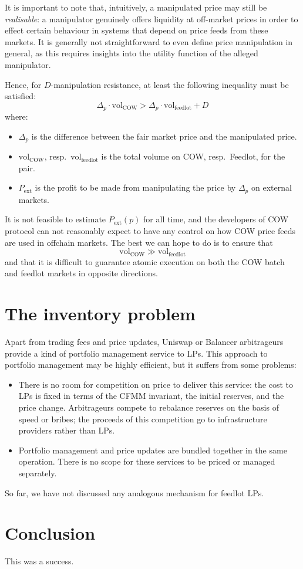 \documentclass[a4paper,10pt]{article}
\newcommand \Vol {\mathrm{vol}}
\begin{document}
It is important to note that, intuitively, a manipulated price may still be \emph{realisable}: a manipulator genuinely offers liquidity at off-market prices in order to effect certain behaviour in systems that depend on price feeds from these markets.
%
It is generally not straightforward to even define price manipulation in general, as this requires insights into the utility function of the alleged manipulator.

Hence, for $D$-manipulation resistance, at least the following inequality must be satisfied:
\[ \Delta_p \cdot\Vol_\mathrm{COW} > \Delta_p\cdot \Vol_\mathrm{feedlot} + D \]
where:
\begin{itemize}
  \item $\Delta_p$ is the difference between the fair market price and the manipulated price.
  \item $\Vol_\mathrm{COW}$, resp.~$\Vol_\mathrm{feedlot}$ is the total volume on COW, resp.~Feedlot, for the pair.
  \item $P_\mathrm{ext}$ is the profit to be made from manipulating the price by $\Delta_p$ on external markets.
\end{itemize}

It is not feasible to estimate $P_\mathrm{ext}(p)$ for all time, and the developers of COW protocol can not reasonably expect to have any control on how COW price feeds are used in offchain markets.
%
The best we can hope to do is to ensure that
\[
  \Vol_\mathrm{COW} \gg \Vol_\mathrm{feedlot}
\]
and that it is difficult to guarantee atomic execution on both the COW batch and feedlot markets in opposite directions.



\section{The inventory problem}

Apart from trading fees and price updates, Uniswap or Balancer arbitrageurs provide a kind of portfolio management service to LPs.
%
This approach to portfolio management may be highly efficient, but it suffers from some problems:
\begin{itemize}
  \item 
    There is no room for competition on price to deliver this service: the cost to LPs is fixed in terms of the CFMM invariant, the initial reserves, and the price change.
    Arbitrageurs compete to rebalance reserves on the basis of speed or bribes; the proceeds of this competition go to infrastructure providers rather than LPs.
    
  \item
    Portfolio management and price updates are bundled together in the same operation. There is no scope for these services to be priced or managed separately.
    
\end{itemize}

So far, we have not discussed any analogous mechanism for feedlot LPs.

\section{Conclusion}

This was a success.

\printbibliography
\end{document}
